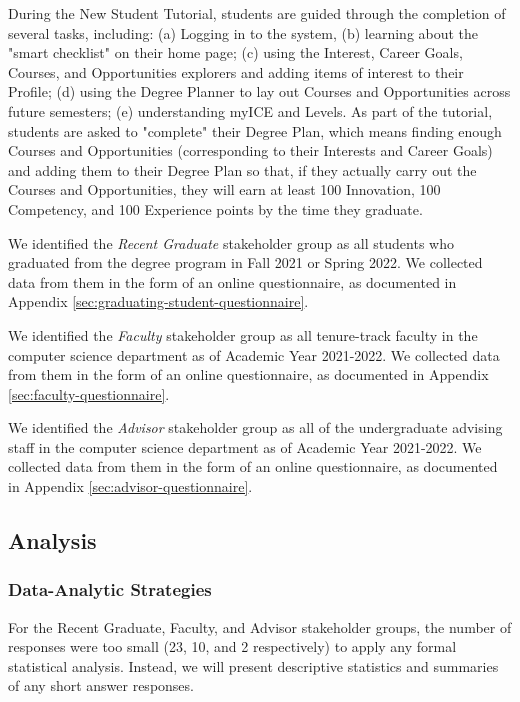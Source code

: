 \documentclass[acmsmall]{acmart}
\begin{document}
During the New Student Tutorial, students are guided through the completion of several tasks, including: (a) Logging in to the system, (b) learning about the "smart checklist" on their home page; (c) using the Interest, Career Goals, Courses, and Opportunities explorers and adding items of interest to their Profile; (d) using the Degree Planner to lay out Courses and Opportunities across future semesters; (e) understanding myICE and Levels. As part of the tutorial, students are asked to "complete" their Degree Plan, which means finding enough Courses and Opportunities (corresponding to their Interests and Career Goals) and adding them to their Degree Plan so that, if they actually carry out the Courses and Opportunities, they will earn at least 100 Innovation, 100 Competency, and 100 Experience points by the time they graduate.

We identified the {\em Recent Graduate} stakeholder group as all students who graduated from the degree program in Fall 2021 or Spring 2022.  We collected data from them in the form of an online questionnaire, as documented in Appendix \ref{sec:graduating-student-questionnaire}.

We identified the {\em Faculty} stakeholder group as all tenure-track faculty in the computer science department as of Academic Year 2021-2022. We collected data from them in the form of an online questionnaire, as documented in Appendix \ref{sec:faculty-questionnaire}.

We identified the {\em Advisor} stakeholder group as all of the undergraduate advising staff in the computer science department as of Academic Year 2021-2022. We collected data from them in the form of an online questionnaire, as documented in Appendix \ref{sec:advisor-questionnaire}.

\subsection{Analysis}

\subsubsection{Data-Analytic Strategies}

For the Recent Graduate, Faculty, and Advisor stakeholder groups, the number of responses were too small (23, 10, and 2 respectively) to apply any formal statistical analysis.  Instead, we will present descriptive statistics and summaries of any short answer responses.
\end{document}
